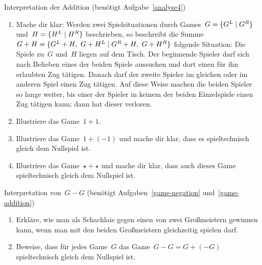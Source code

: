 \documentclass{zirkelblatt}
\begin{document}
\begin{aufgabe}{Interpretation der Addition (benötigt Aufgabe~\ref{analyse4})}
\label{game-addition}
\begin{enumerate}
\item Mache dir klar: Werden zwei Spielsituationen durch Games~$G =
\{ G^L \mathrel{|} G^R \}$ und~$H = \{ H^L \mathrel{|} H^R \}$ beschrieben, so beschreibt die Summe~$G
+ H = \{ G^L + H,\ G + H^L \mathrel{|} G^R + H,\ G + H^R \}$ folgende Situation: Die
Spiele zu~$G$ und~$H$ liegen auf dem Tisch. Der beginnende Spieler darf sich
nach Belieben eines der beiden Spiele aussuchen und dort einen für ihn
erlaubten Zug tätigen. Danach darf der zweite Spieler im gleichen oder im
anderen Spiel einen Zug tätigen. Auf diese Weise machen die beiden Spieler so
lange weiter, bis einer der Spieler in keinem der beiden Einzelspiele einen Zug
tätigen kann; dann hat dieser verloren.
\item Illustriere das Game~$1 + 1$.
\item Illustriere das Game~$1 + (-1)$ und mache dir klar, dass es
spieltechnisch gleich dem Nullspiel ist.
\item Illustriere das Game~$\star + \star$ und mache dir klar, dass auch dieses
Game spieltechnisch gleich dem Nullspiel ist.
\end{enumerate}
\end{aufgabe}

\begin{aufgabe}{Interpretation von~$G - G$ (benötigt
Aufgaben~\ref{game-negation} und~\ref{game-addition})}
\label{game-gg}
\begin{enumerate}
\item Erkläre, wie man als Schachlaie gegen einen von zwei Großmeistern
gewinnen kann, wenn man mit den beiden Großmeistern gleichzeitig spielen darf.
\item Beweise, dass für jedes Game~$G$ das Game~$G - G = G + (-G)$ spieltechnisch
gleich dem Nullspiel ist.
\end{enumerate}
\end{aufgabe}
\end{document}
